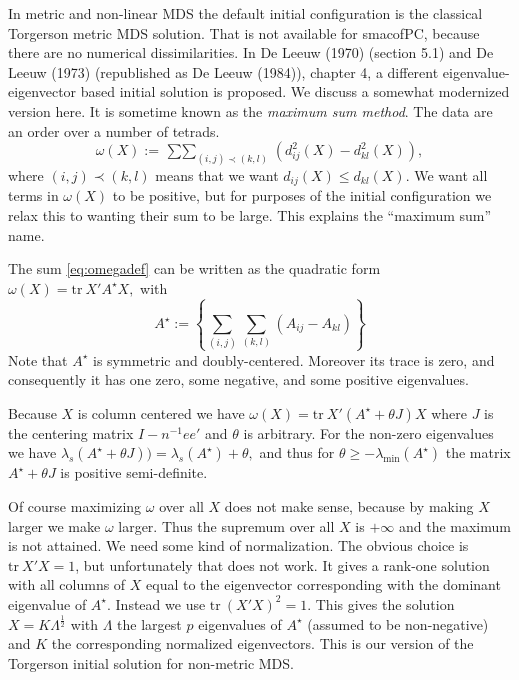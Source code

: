 \documentclass[
  12pt,
]{article}
\begin{document}
In metric and non-linear MDS the default initial configuration is the
classical Torgerson metric MDS solution. That is not available for
smacofPC, because there are no numerical dissimilarities. In
De Leeuw (1970) (section 5.1) and De Leeuw (1973) (republished as De Leeuw (1984)), chapter 4, a different eigenvalue-eigenvector based initial solution is proposed. We discuss a somewhat modernized version here. It is sometime known as the \emph{maximum sum method}.
The data are an order over a number of tetrads.
\begin{equation}
\omega(X):=\mathop{\sum\sum}_{(i,j)\prec(k,l)}(d_{ij}^2(X)-d_{kl}^2(X)),
\label{eq:omegadef}
\end{equation}
where \((i,j)\prec(k,l)\) means that we want \(d_{ij}(X)\leq d_{kl}(X)\).
We want all terms in \(\omega(X)\) to be positive, but for purposes of
the initial configuration we relax this to wanting their sum to be
large. This explains the ``maximum sum'' name.

The sum \eqref{eq:omegadef} can be written as the quadratic form
\(\omega(X)=\text{tr}\ X'A^\star X,\)
with
\begin{equation}
A^\star:=\left\{\sum_{(i,j)}\sum_{(k,l)}(A_{ij}-A_{kl})\right\} 
\label{eq:astardef}
\end{equation}
Note that \(A^\star\) is symmetric and doubly-centered. Moreover
its trace is zero, and consequently it has one zero, some negative,
and some positive eigenvalues.

Because \(X\) is column centered we have
\(\omega(X)=\text{tr}\ X'(A^\star + \theta J)X\) where \(J\) is the
centering matrix \(I-n^{-1}ee'\) and \(\theta\) is arbitrary. For
the non-zero eigenvalues we have
\(\lambda_s(A^\star + \theta J))=\lambda_s(A^\star) + \theta,\)
and thus for \(\theta\geq-\lambda_{\text{min}}(A^\star)\) the matrix \(A^\star + \theta J\) is positive semi-definite.

Of course maximizing \(\omega\) over all \(X\) does not make sense, because
by making \(X\) larger we make \(\omega\) larger. Thus the supremum over all
\(X\) is \(+\infty\) and the maximum is not attained. We need some
kind of normalization. The obvious choice is \(\text{tr}\ X'X=1\), but
unfortunately that does not work. It gives a rank-one solution
with all columns of \(X\) equal to the eigenvector corresponding with the
dominant eigenvalue of \(A^\star\). Instead we use \(\text{tr}\ (X'X)^2=1\).
This gives the solution \(X=K\Lambda^\frac12\) with \(\Lambda\) the largest \(p\) eigenvalues of \(A^\star\) (assumed to be non-negative) and \(K\) the
corresponding normalized eigenvectors. This is our version of
the Torgerson initial solution for non-metric MDS.
\end{document}
